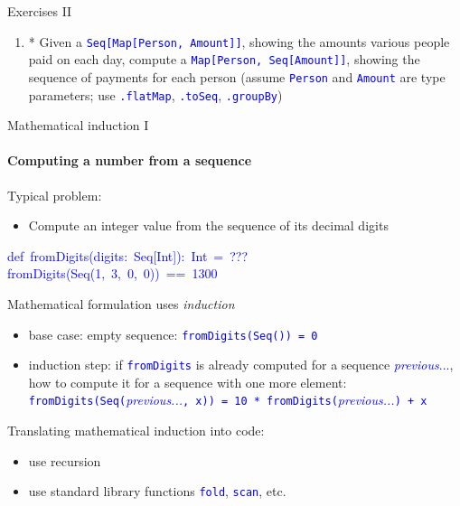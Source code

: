 \documentclass[english]{beamer}
\newenvironment{lyxcode}
  {\par\begin{list}{}{
    \setlength{\rightmargin}{\leftmargin}
    \setlength{\listparindent}{0pt}%
    \raggedright
    \setlength{\itemsep}{0pt}
    \setlength{\parsep}{0pt}
    \normalfont\ttfamily}%
   \def\{{\char`\{}
   \def\}{\char`\}}
   \def\textasciitilde{\char`\~}
   \item[]}
  {\end{list}}
\begin{document}
\begin{frame}{Exercises II}
\begin{enumerate}
\begin{itemize}
\end{itemize}
\item {*} Given a \texttt{\textcolor{blue}{\footnotesize{}Seq{[}Map{[}Person,
Amount{]}{]}}}, showing the amounts various people paid on each day,
compute a \texttt{\textcolor{blue}{\footnotesize{}Map{[}Person, Seq{[}Amount{]}{]}}},
showing the sequence of payments for each person (assume \texttt{\textcolor{blue}{\footnotesize{}Person}}
and \texttt{\textcolor{blue}{\footnotesize{}Amount}} are type parameters;
use \texttt{\textcolor{blue}{\footnotesize{}.flatMap}}, \texttt{\textcolor{blue}{\footnotesize{}.toSeq}},
\texttt{\textcolor{blue}{\footnotesize{}.groupBy}})
\end{enumerate}
\end{frame}

\begin{frame}{Mathematical induction I}


\framesubtitle{Computing a number from a sequence}

Typical problem:
\begin{itemize}
\item Compute an integer value from the sequence of its decimal digits
\end{itemize}
\begin{lyxcode}
\textcolor{blue}{\footnotesize{}def~fromDigits(digits:~Seq{[}Int{]}):~Int~=~???}~\\

\textcolor{blue}{\footnotesize{}fromDigits(Seq(1,~3,~0,~0))~==~1300}{\footnotesize\par}
\end{lyxcode}
Mathematical formulation uses \emph{induction}
\begin{itemize}
\item base case: empty sequence: \texttt{\textcolor{blue}{\footnotesize{}fromDigits(Seq())
= 0}}{\footnotesize\par}
\item induction step: if \texttt{\textcolor{blue}{\footnotesize{}fromDigits}}
is already computed for a sequence \textcolor{blue}{\emph{\footnotesize{}previous}}\textcolor{blue}{\footnotesize{}...},
how to compute it for a sequence with one more element:\texttt{\textcolor{blue}{\footnotesize{}}}~\\
\texttt{\textcolor{blue}{\footnotesize{}fromDigits(Seq(}}\textcolor{blue}{\emph{\footnotesize{}previous...}}\texttt{\textcolor{blue}{\footnotesize{},
x)) = 10 {*} fromDigits(}}\textcolor{blue}{\emph{\footnotesize{}previous...}}\texttt{\textcolor{blue}{\footnotesize{})
+ x}}{\footnotesize\par}
\end{itemize}
Translating mathematical induction into code:
\begin{itemize}
\item use recursion
\item use standard library functions \texttt{\textcolor{blue}{\footnotesize{}fold}},
\texttt{\textcolor{blue}{\footnotesize{}scan}}, etc.
\end{itemize}
\end{frame}
\end{document}
